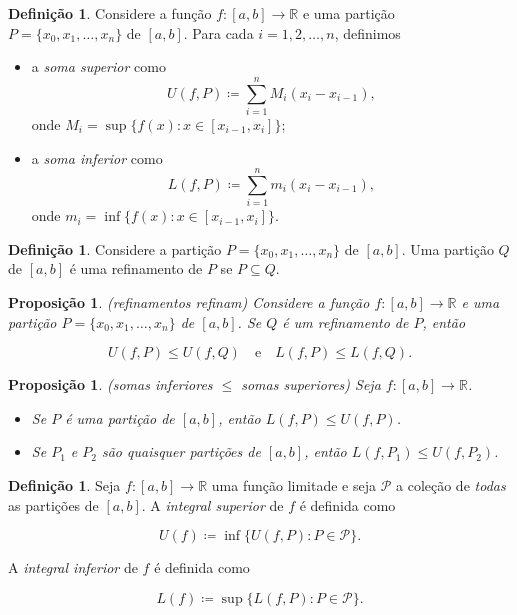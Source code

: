\documentclass[12pt]{article}
\theoremstyle{plain}
\newtheorem{prop}[thm]{Proposição}
\theoremstyle{definition}
\newtheorem{defn}[thm]{Definição}
\theoremstyle{remark}
\begin{document}
\begin{defn}
    Considere a função \(f : [a,b] \to \mathbb{R}\) e uma partição \(P = \{x_0, x_1, \ldots, x_n\}\) de \([a,b]\). Para cada \(i = 1, 2, \ldots, n\), definimos

    \begin{itemize}
        \item a \emph{soma superior} como \[U(f, P) \coloneq \sum_{i=1}^{n} M_i (x_i - x_{i-1}),\] onde \(M_i = \sup\{f(x) : x \in [x_{i-1}, x_i]\}\);
        \item a \emph{soma inferior} como \[L(f, P) \coloneq \sum_{i=1}^{n} m_i (x_i - x_{i-1}),\] onde \(m_i = \inf\{f(x) : x \in [x_{i-1}, x_i]\}\).
    \end{itemize}
\end{defn}

\begin{defn}
    Considere a partição \(P = \{x_0, x_1, \ldots, x_n\}\) de \([a,b]\). Uma partição \(Q\) de \([a,b]\) é uma refinamento de \(P\) se \(P \subseteq Q\).
\end{defn}

\begin{prop} (refinamentos refinam)
    Considere a função \(f : [a,b] \to \mathbb{R}\) e uma partição \(P = \{x_0, x_1, \ldots, x_n\}\) de \([a,b]\). Se \(Q\) é um refinamento de \(P\), então

    \begin{equation}
        U(f, P) \leq U(f, Q) \quad \text{e} \quad L(f, P) \leq L(f, Q).
    \end{equation}
\end{prop}

\begin{prop} (somas inferiores \(\leq\) somas superiores)
    Seja \(f : [a,b] \to \mathbb{R}\).

    \begin{itemize}
        \item[(a)] Se \(P\) é uma partição de \([a,b]\), então \(L(f, P) \leq U(f, P)\).
        \item[(b)] Se \(P_1\) e \(P_2\) são quaisquer partições de \([a,b]\), então \(L(f, P_1) \leq U(f, P_2)\). 
    \end{itemize}
\end{prop}

\begin{defn}
    Seja \(f : [a,b] \to \mathbb{R}\) uma função limitade e seja \(\mathcal{P}\) a coleção de \emph{todas} as partições de \([a,b]\). A \emph{integral superior} de \(f\) é definida como

    \begin{equation}
        U(f) \coloneq \inf\{U(f, P) : P \in \mathcal{P}\}.
    \end{equation}

    \noindent A \emph{integral inferior} de \(f\) é definida como

    \begin{equation}
        L(f) \coloneq \sup\{L(f, P) : P \in \mathcal{P}\}.
    \end{equation}
\end{defn}
\end{document}
